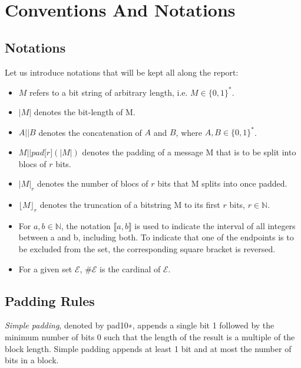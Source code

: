 \chapter{Conventions And Notations}
\section{Notations}
Let us introduce notations that will be kept all along the report:
\begin{itemize}
  \item $M$ refers to a bit string of arbitrary length, i.e. $M \in {\{0,1\}}^*$.
  \item $\vert M\vert$ denotes the bit-length of M.
  \item $A\vert \vert B$ denotes the concatenation of $A$ and $B$, where $A, B \in {\{0,1\}}^*$.
  \item $ M\vert \vert pad\lbrack r\rbrack (\vert M\vert )$ denotes the padding of a message M that is to be split into blocs of $r$ bits.
  \item $\vert M\vert_r$ denotes the number of blocs  of $r$ bits that M splits into once padded.
  \item $\lfloor M\rfloor_r$ denotes the truncation of a bitstring M to its first $r$ bits, $r\in \mathbb{N}$.
  \item For $a, b \in \mathbb{N}$, the notation  $\llbracket a,b \rrbracket$ is used to indicate the interval of all integers between a and b, including both. To indicate that one of the endpoints is to be excluded from the set, the corresponding square bracket is reversed.
  \item For a given set $\mathcal{E}$, $\# \mathcal{E}$ is the cardinal of $\mathcal{E}$.
\end{itemize}

\section{Padding Rules}\label{section:padding}

\begin{defn} \emph{Simple padding}, denoted by pad10∗, appends a single bit 1 followed by the minimum number of bits 0 such that the length of the result is a multiple of the block length.
Simple padding appends at least 1 bit and at most the number of bits in a block. 
\end{defn}

